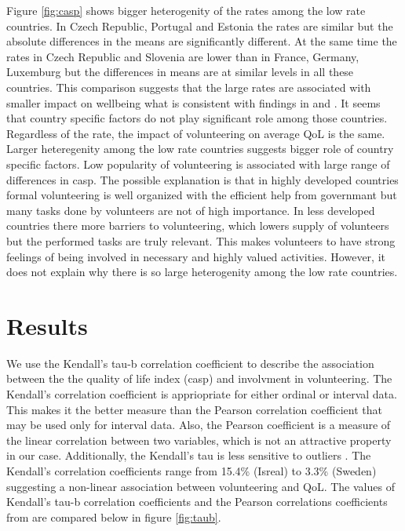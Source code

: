 \documentclass[10pt, letterpaper]{article}
\begin{document}
\begin{spacing}{1.4}
Figure \ref{fig:casp} shows bigger heterogenity of the rates among the low rate countries. In Czech Republic, Portugal and Estonia the rates are similar but the absolute differences in the means are significantly different. At the same time the rates in Czech Republic and Slovenia are lower than in France, Germany, Luxemburg but the differences in means are at similar levels in all these countries. This comparison suggests that the large rates are associated with smaller impact on wellbeing what is consistent with findings in \citet{haski09} and \citet{plagnol10}. It seems that country specific factors do not play significant role among those countries. Regardless of  the rate, the impact of volunteering on average QoL is the same. Larger heteregenity  among the low rate countries suggests bigger role of country specific factors. Low popularity of volunteering is associated with large range of differences in casp. The possible explanation is that in highly developed countries formal volunteering is well organized with the efficient help from governmant but many tasks done by volunteers are not of high importance. In less developed countries there more barriers to volunteering,  which lowers supply of volunteers but the performed tasks are truly relevant. This makes volunteers to have strong feelings of being involved in necessary and highly valued activities. However, it does not explain why there is so large heterogenity among the low rate countries.   



\section{Results}

We use the Kendall's tau-b correlation coefficient to describe the association between the the quality of life index (casp) and involvment in volunteering. The Kendall's correlation coefficient is appriopriate for either ordinal or interval data. This makes it the better measure than the Pearson correlation coefficient that may be used only for interval data.  Also, the Pearson coefficient is a measure of the linear correlation between two variables, which is not an attractive property in our case. Additionally, the Kendall's tau is less sensitive to outliers  \citet{khamis08}. The Kendall's correlation coefficients range from 15.4\% (Isreal) to 3.3\% (Sweden) suggesting a non-linear association between volunteering and QoL. The values of Kendall's tau-b correlation coefficients and the Pearson correlations coefficients from \citet{haski09} are compared below in figure \ref{fig:taub}.



\end{spacing}
\end{document}
